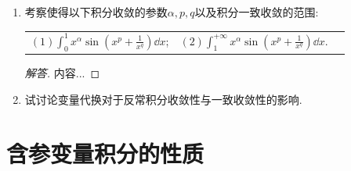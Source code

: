 \begin{b}
\begin{enumerate}
\item 考察使得以下积分收敛的参数\(\alpha,p,q\)以及积分一致收敛的范围:
\begin{center}
\begin{tabular}{lcl}
\((1)\int_{0}^{1}x^\alpha\sin\left(x^p+\frac{1}{x^q}\right)\dd x\);&
\((2)\int_{1}^{+\infty}x^\alpha\sin\left(x^p+\frac{1}{x^q}\right)\dd x\).
\end{tabular}
\end{center}
\begin{proof}[解答]
内容...
\end{proof}
\item 试讨论变量代换对于反常积分收敛性与一致收敛性的影响.
\end{enumerate}
\end{b}

\section{含参变量积分的性质}
